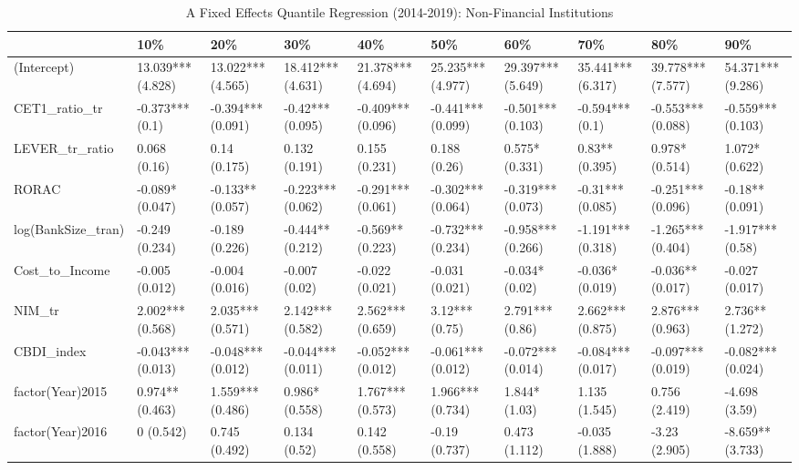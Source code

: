 \begin{table}[ht]
\centering
\caption{A Fixed Effects Quantile Regression (2014-2019): Non-Financial Institutions} 
\begingroup\small
\begin{tabular}{llllllllll}
  \toprule
 & 10\% & 20\% & 30\% & 40\% & 50\% & 60\% & 70\% & 80\% & 90\% \\ 
  \midrule
(Intercept) & 13.039*** (4.828) & 13.022*** (4.565) & 18.412*** (4.631) & 21.378*** (4.694) & 25.235*** (4.977) & 29.397*** (5.649) & 35.441*** (6.317) & 39.778*** (7.577) & 54.371*** (9.286) \\ 
  CET1\_ratio\_tr & -0.373*** (0.1) & -0.394*** (0.091) & -0.42*** (0.095) & -0.409*** (0.096) & -0.441*** (0.099) & -0.501*** (0.103) & -0.594*** (0.1) & -0.553*** (0.088) & -0.559*** (0.103) \\ 
  LEVER\_tr\_ratio & 0.068 (0.16) & 0.14 (0.175) & 0.132 (0.191) & 0.155 (0.231) & 0.188 (0.26) & 0.575* (0.331) & 0.83** (0.395) & 0.978* (0.514) & 1.072* (0.622) \\ 
  RORAC & -0.089* (0.047) & -0.133** (0.057) & -0.223*** (0.062) & -0.291*** (0.061) & -0.302*** (0.064) & -0.319*** (0.073) & -0.31*** (0.085) & -0.251*** (0.096) & -0.18** (0.091) \\ 
  log(BankSize\_tran) & -0.249 (0.234) & -0.189 (0.226) & -0.444** (0.212) & -0.569** (0.223) & -0.732*** (0.234) & -0.958*** (0.266) & -1.191*** (0.318) & -1.265*** (0.404) & -1.917*** (0.58) \\ 
  Cost\_to\_Income & -0.005 (0.012) & -0.004 (0.016) & -0.007 (0.02) & -0.022 (0.021) & -0.031 (0.021) & -0.034* (0.02) & -0.036* (0.019) & -0.036** (0.017) & -0.027 (0.017) \\ 
  NIM\_tr & 2.002*** (0.568) & 2.035*** (0.571) & 2.142*** (0.582) & 2.562*** (0.659) & 3.12*** (0.75) & 2.791*** (0.86) & 2.662*** (0.875) & 2.876*** (0.963) & 2.736** (1.272) \\ 
  CBDI\_index & -0.043*** (0.013) & -0.048*** (0.012) & -0.044*** (0.011) & -0.052*** (0.012) & -0.061*** (0.012) & -0.072*** (0.014) & -0.084*** (0.017) & -0.097*** (0.019) & -0.082*** (0.024) \\ 
  factor(Year)2015 & 0.974** (0.463) & 1.559*** (0.486) & 0.986* (0.558) & 1.767*** (0.573) & 1.966*** (0.734) & 1.844* (1.03) & 1.135 (1.545) & 0.756 (2.419) & -4.698 (3.59) \\ 
  factor(Year)2016 & 0 (0.542) & 0.745 (0.492) & 0.134 (0.52) & 0.142 (0.558) & -0.19 (0.737) & 0.473 (1.112) & -0.035 (1.888) & -3.23 (2.905) & -8.659** (3.733) \\ 

\end{tabular}
\end{table}
